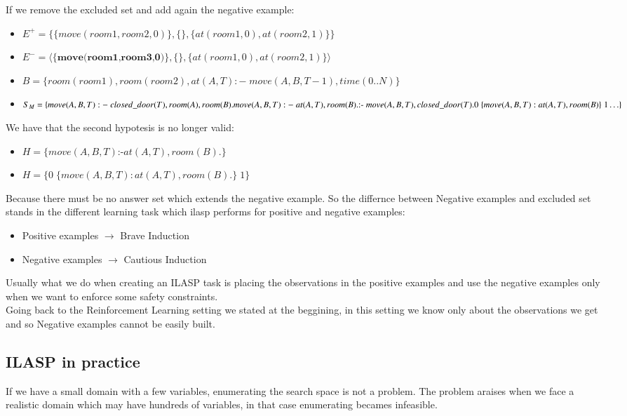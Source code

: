 If we remove the excluded set and add again the negative example:
\begin{itemize}
    \item $E^+ = \{\{move(room1,room2,0)\},\{\}, \{at(room1,0),at(room2,1)\}\}$
    \item $E^- = \langle\{\textbf{move(room1,room3,0)}\},\{\},\{at(room1,0),at(room2,1)\}\rangle$
    \item $B = \{room(room1), room(room2), at(A,T) :-\; move(A,B,T-1), time(0..N)\}$
    \item $S_{M}=\{\\
                move(A,B,T) :-\; closed\_door(T), room(A), room(B). \\
                move(A,B,T) :-\; at(A,T), room(B).\\
                \text{:-}\; move(A,B,T), closed\_door(T).\\
                0\;\{move(A,B,T) : at(A,T), room(B)\}\;1\\
                \ldots\} \;$
\end{itemize}
We have that the second hypotesis is no longer valid:
\begin{itemize}
    \item $H = \{move(A,B,T) \text{:-} at(A,T), room(B).\}$
    \item\st{$H = \{0\; \{move(A,B,T) : at(A,T), room(B).\}\; 1\}$}
\end{itemize}
Because there must be no answer set which extends the negative example.
So the differnce between Negative examples and excluded set stands in the 
different learning task which ilasp performs for positive and negative examples:
\begin{itemize}
    \item Positive examples $\rightarrow$ Brave Induction
    \item Negative examples $\rightarrow$ Cautious Induction
\end{itemize}

Usually what we do when creating an ILASP task is placing the observations in 
the positive examples and use the negative examples only when we want to enforce some safety constraints.\\

Going back to the Reinforcement Learning setting we stated at the beggining,
in this setting we know only about the observations we get and so Negative examples cannot be easily built.

\subsection{ILASP in practice}
If we have a small domain with a few variables, enumerating the
search space is not a problem. The problem araises when we face a realistic domain
which may have hundreds of variables, in that case enumerating becames infeasible.

